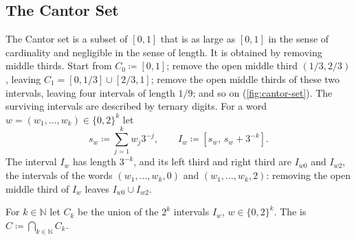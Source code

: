 \subsection{The Cantor Set}

The Cantor set is a subset of $[0,1]$ that is as large as $[0,1]$ in the sense of cardinality and negligible in the sense of length. It is obtained by removing middle thirds. Start from $C_0\coloneqq[0,1]$; remove the open middle third $(1/3,2/3)$, leaving $C_1=[0,1/3]\cup[2/3,1]$; remove the open middle thirds of these two intervals, leaving four intervals of length $1/9$; and so on (\cref{fig:cantor-set}). The surviving intervals are described by ternary digits. For a word $w=(w_1,\ldots,w_k)\in\{0,2\}^k$ let
\[
s_w\coloneqq\sum_{j=1}^kw_j3^{-j},\qquad I_w\coloneqq[s_w,\,s_w+3^{-k}] .
\]
The interval $I_w$ has length $3^{-k}$, and its left third and right third are $I_{w0}$ and $I_{w2}$, the intervals of the words $(w_1,\ldots,w_k,0)$ and $(w_1,\ldots,w_k,2)$: removing the open middle third of $I_w$ leaves $I_{w0}\cup I_{w2}$.

\begin{definition}
\label{def:cantor-set}
For $k\in\mathbb N$ let $C_k$ be the union of the $2^k$ intervals $I_w$, $w\in\{0,2\}^k$. The  is $C\coloneqq\bigcap_{k\in\mathbb N}C_k$.
\end{definition}

